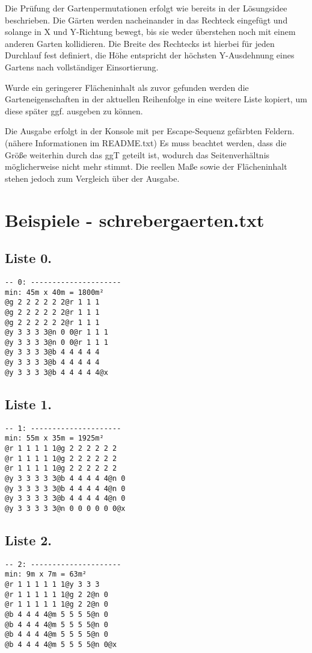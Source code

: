 \documentclass[a4paper,10pt,ngerman]{scrartcl}
\begin{document}
Die Prüfung der Gartenpermutationen erfolgt wie bereits in der Lösungsidee beschrieben.
Die Gärten werden nacheinander in das Rechteck eingefügt und solange in X und Y-Richtung bewegt, bis sie weder überstehen noch mit einem anderen Garten kollidieren. Die Breite des Rechtecks ist hierbei für jeden Durchlauf fest definiert, die Höhe entspricht der höchsten Y-Ausdehnung eines Gartens nach vollständiger Einsortierung.

Wurde ein geringerer Flächeninhalt als zuvor gefunden werden die Garteneigenschaften in der aktuellen Reihenfolge in eine weitere Liste kopiert, um diese später ggf. ausgeben zu können.

Die Ausgabe erfolgt in der Konsole mit per Escape-Sequenz gefärbten Feldern. (nähere Informationen im README.txt) Es muss beachtet werden, dass die Größe weiterhin durch das ggT geteilt ist, wodurch das Seitenverhältnis möglicherweise nicht mehr stimmt. Die reellen Maße sowie der Flächeninhalt stehen jedoch zum Vergleich über der Ausgabe.

\section[Beispiele]{Beispiele - schrebergaerten.txt}
\subsection{Liste 0.}
\begin{lstlisting}
-- 0: ---------------------
min: 45m x 40m = 1800m²
@g 2 2 2 2 2 2@r 1 1 1
@g 2 2 2 2 2 2@r 1 1 1
@g 2 2 2 2 2 2@r 1 1 1
@y 3 3 3 3@n 0 0@r 1 1 1
@y 3 3 3 3@n 0 0@r 1 1 1
@y 3 3 3 3@b 4 4 4 4 4
@y 3 3 3 3@b 4 4 4 4 4
@y 3 3 3 3@b 4 4 4 4 4@x
\end{lstlisting}

\subsection{Liste 1.}
\begin{lstlisting}
-- 1: ---------------------
min: 55m x 35m = 1925m²
@r 1 1 1 1 1@g 2 2 2 2 2 2
@r 1 1 1 1 1@g 2 2 2 2 2 2
@r 1 1 1 1 1@g 2 2 2 2 2 2
@y 3 3 3 3 3@b 4 4 4 4 4@n 0
@y 3 3 3 3 3@b 4 4 4 4 4@n 0
@y 3 3 3 3 3@b 4 4 4 4 4@n 0
@y 3 3 3 3 3@n 0 0 0 0 0 0@x
\end{lstlisting}

\subsection{Liste 2.}
\begin{lstlisting}
-- 2: ---------------------
min: 9m x 7m = 63m²
@r 1 1 1 1 1 1@y 3 3 3
@r 1 1 1 1 1 1@g 2 2@n 0
@r 1 1 1 1 1 1@g 2 2@n 0
@b 4 4 4 4@m 5 5 5 5@n 0
@b 4 4 4 4@m 5 5 5 5@n 0
@b 4 4 4 4@m 5 5 5 5@n 0
@b 4 4 4 4@m 5 5 5 5@n 0@x
\end{lstlisting}
\end{document}
